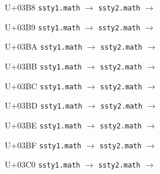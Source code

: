 \documentclass{article}
\begin{document}
\begin{substitutions}
\goodbreak

U+03B8  \linebreak
    \texttt{ssty1.math} $\to$  \linebreak
    \texttt{ssty2.math} $\to$  

\goodbreak

U+03B9  \linebreak
    \texttt{ssty1.math} $\to$  \linebreak
    \texttt{ssty2.math} $\to$  

\goodbreak

U+03BA  \linebreak
    \texttt{ssty1.math} $\to$  \linebreak
    \texttt{ssty2.math} $\to$  

\goodbreak

U+03BB  \linebreak
    \texttt{ssty1.math} $\to$  \linebreak
    \texttt{ssty2.math} $\to$  

\goodbreak

U+03BC  \linebreak
    \texttt{ssty1.math} $\to$  \linebreak
    \texttt{ssty2.math} $\to$  

\goodbreak

U+03BD  \linebreak
    \texttt{ssty1.math} $\to$  \linebreak
    \texttt{ssty2.math} $\to$  

\goodbreak

U+03BE  \linebreak
    \texttt{ssty1.math} $\to$  \linebreak
    \texttt{ssty2.math} $\to$  

\goodbreak

U+03BF  \linebreak
    \texttt{ssty1.math} $\to$  \linebreak
    \texttt{ssty2.math} $\to$  

\goodbreak

U+03C0  \linebreak
    \texttt{ssty1.math} $\to$  \linebreak
    \texttt{ssty2.math} $\to$  


\end{substitutions}
\end{document}
